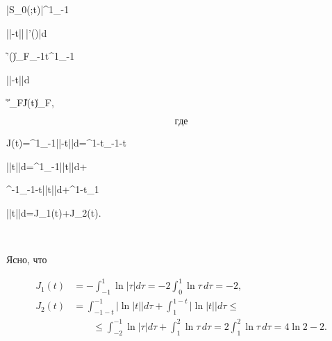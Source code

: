 |S_0(\varphi;t)|\le{}\int^1_{-1} 


\big|\ln|\tau-t|\big|\,|\varphi'(\tau)|d\tau\le{} 


\|\varphi'(\tau)\|_F\max_{-1\le t}\int^1_{-1} 


\big|\ln|\tau-t|\big|d\tau\equiv{} 


\|\varphi'\|_F\|J(t)\|_F, 


$$ 


где 


$$ 


J(t)=\int^1_{-1}\big|\ln|\tau-t|\big|d\tau=\int^{1-t}_{-1-t} 


\big|\ln|t|\big|d\tau=\int^1_{-1}\big|\ln|t|\big|d\tau+ 


\int^{-1}_{-1-t}\big|\ln|t|\big|d\tau+\int^{1-t}_1 


\big|\ln|t|\big|d\tau=J_1(t)+J_2(t). 


$$ 


Ясно, что 


\begin{align*} 


J_1(t)&=-\int^1_{-1}\ln|\tau|d\tau=-2\int^1_0 


\ln\tau\,d\tau=-2, \\ 


% 


J_2(t)&=\int^{-1}_{-1-t}\big|\ln|t|\big|d\tau+ 


\int^{1-t}_1\big|\ln|t|\big|d\tau\le \\ 


&\qquad \le \int^{-1}_{-2}\ln|\tau|d\tau+\int^2_1\ln\tau\,d\tau= 


2\int^2_1\ln\tau\,d\tau=4\ln2-2. 


\end{align*} 


